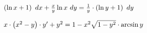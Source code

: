 \begin{multicols}{2}
\begin{enumtasks}
		\end{enumtasks}
	\end{multicols}

	\begin{enumtasks}

		\item \( \left( \ln{x} + 1 \right) ~ dx + \frac{x}{y} \ln{x} ~ dy = \frac{1}{y} \cdot \left( \ln{y} + 1 \right) ~ dy \) 	%
		\item \( x \cdot \left( x^2 - y \right) \cdot y' + y^2 = 1 - x^2 \sqrt{1 - y^2} \cdot \arcsin{y} \) 				%
	
	\end{enumtasks}
